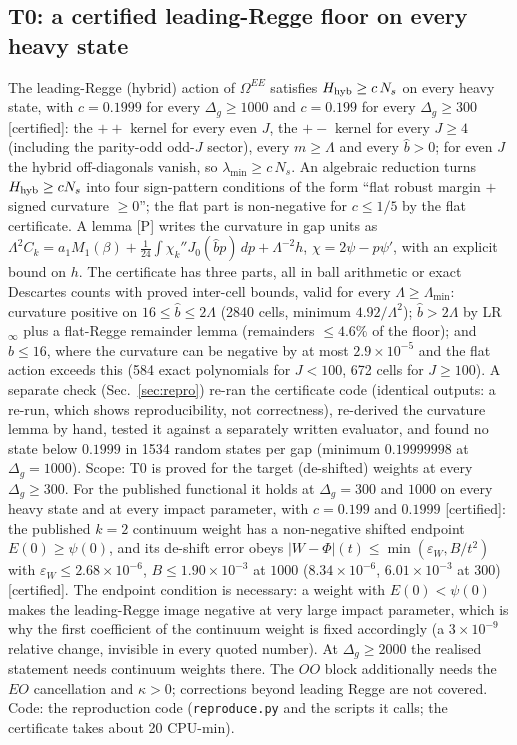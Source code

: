 \documentclass[aps,prl,onecolumn,superscriptaddress,nofootinbib]{revtex4-2}
\begin{document}
\subsection{T0: a certified leading-Regge floor on every heavy state}
\label{sec:T0}
The leading-Regge (hybrid) action of $\Omega^{EE}$ satisfies $H_{\rm hyb}\ge c\,N_s$ on every heavy state, with $c=0.1999$ for every
$\Delta_g\ge1000$ and $c=0.199$ for every $\Delta_g\ge300$ [certified]: the $++$ kernel for every even $J$, the $+-$ kernel for every
$J\ge4$ (including the parity-odd odd-$J$ sector), every $m\ge\Lambda$ and every $\hat b>0$; for even $J$ the hybrid
off-diagonals vanish, so $\lambda_{\min}\ge c\,N_s$. An algebraic reduction turns $H_{\rm hyb}\ge cN_s$ into four sign-pattern conditions of
the form ``flat robust margin $+$ signed curvature $\ge0$''; the flat part is non-negative for $c\le1/5$ by the flat
certificate. A lemma [P] writes the curvature in gap units as $\Lambda^2C_k=a_1M_1(\beta)+\frac1{24}\int\chi_k''J_0(\hat bp)\,dp
+\Lambda^{-2}h$, $\chi=2\psi-p\psi'$, with an explicit bound on $h$. The certificate has three parts, all in ball arithmetic or exact
Descartes counts with proved inter-cell bounds, valid for every $\Lambda\ge\Lambda_{\min}$: curvature positive on $16\le\hat b\le2\Lambda$
(2840 cells, minimum $4.92/\Lambda^2$); $\hat b>2\Lambda$ by LR$_\infty$ plus a flat-Regge remainder lemma (remainders $\le4.6\%$ of the
floor); and $\hat b\le16$, where the curvature can be negative by at most $2.9\times10^{-5}$ and the flat action exceeds this (584 exact
polynomials for $J<100$, 672 cells for $J\ge100$). A separate check (Sec.~\ref{sec:repro}) re-ran the certificate code
(identical outputs: a re-run, which shows reproducibility, not correctness), re-derived the curvature lemma by hand, tested it against a
separately written evaluator, and found no state below $0.1999$ in 1534 random states per gap (minimum $0.19999998$ at $\Delta_g=1000$). Scope:
T0 is proved for the target (de-shifted) weights at every $\Delta_g\ge300$. For the published functional it holds at $\Delta_g=300$ and
$1000$ on every heavy state and at every impact parameter, with $c=0.199$ and $0.1999$ [certified]: the published $k=2$ continuum weight
has a non-negative shifted endpoint $E(0)\ge\psi(0)$, and its de-shift error obeys $|W-\Phi|(t)\le\min(\varepsilon_W,B/t^2)$ with
$\varepsilon_W\le2.68\times10^{-6}$, $B\le1.90\times10^{-3}$ at $1000$ ($8.34\times10^{-6}$, $6.01\times10^{-3}$ at $300$) [certified]. The endpoint
condition is necessary: a weight with $E(0)<\psi(0)$ makes the leading-Regge image negative at very large impact parameter, which is why the
first coefficient of the continuum weight is fixed accordingly (a $3\times10^{-9}$ relative change, invisible in every quoted number).
At $\Delta_g\ge2000$ the realised statement needs continuum weights there. The $OO$ block additionally needs the $EO$ cancellation and $\kappa>0$; corrections beyond leading Regge are not covered.
Code: the reproduction code (\texttt{reproduce.py} and the scripts it calls; the certificate takes about 20 CPU-min).
\end{document}
